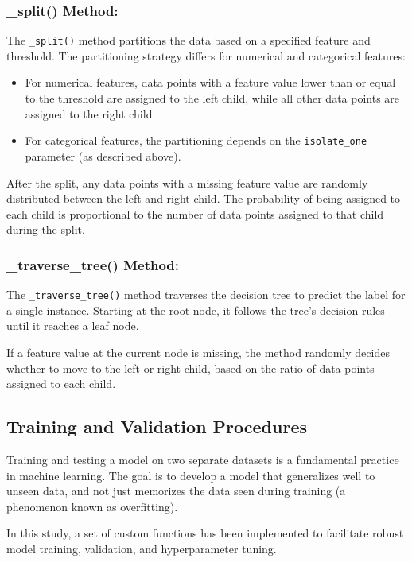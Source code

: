\documentclass{article}
\begin{document}
\subsubsection*{\_split() Method:}

The \texttt{\_split()} method partitions the data based on a specified feature and threshold. The partitioning strategy differs for numerical and categorical features:

\begin{itemize}
\item For numerical features, data points with a feature value lower than or equal to the threshold are assigned to the left child, while all other data points are assigned to the right child.
\item For categorical features, the partitioning depends on the \texttt{isolate\_one} parameter (as described above).
\end{itemize}

After the split, any data points with a missing feature value are randomly distributed between the left and right child. The probability of being assigned to each child is proportional to the number of data points assigned to that child during the split.

\subsubsection*{\_traverse\_tree() Method:}

The \texttt{\_traverse\_tree()} method traverses the decision tree to predict the label for a single instance. Starting at the root node, it follows the tree's decision rules until it reaches a leaf node.

If a feature value at the current node is missing, the method randomly decides whether to move to the left or right child, based on the ratio of data points assigned to each child.

\subsection{Training and Validation Procedures}

Training and testing a model on two separate datasets is a fundamental practice in machine learning. The goal is to develop a model that generalizes well to unseen data, and not just memorizes the data seen during training (a phenomenon known as overfitting).

In this study, a set of custom functions has been implemented to facilitate robust model training, validation, and hyperparameter tuning.
\end{document}
